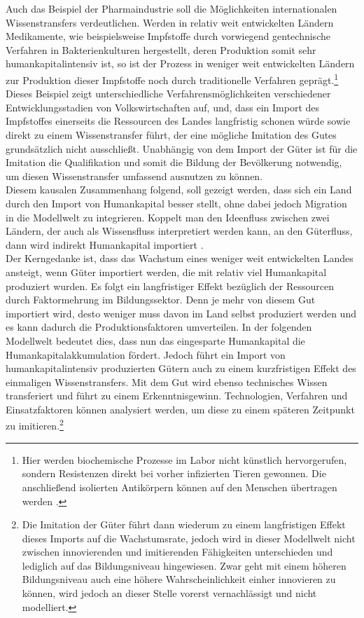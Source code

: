 Auch das Beispiel der Pharmaindustrie soll die Möglichkeiten internationalen Wissenstransfers verdeutlichen. Werden in relativ weit entwickelten Ländern Medikamente, wie beispielsweise Impfstoffe durch vorwiegend gentechnische Verfahren in Bakterienkulturen hergestellt, deren Produktion somit sehr humankapitalintensiv ist, so ist der Prozess in weniger weit entwickelten Ländern zur Produktion dieser Impfstoffe noch durch traditionelle Verfahren geprägt.\footnote{Hier werden biochemische Prozesse im Labor nicht künstlich hervorgerufen, sondern Resistenzen direkt bei vorher infizierten Tieren gewonnen. Die anschlie{\ss}end isolierten Antikörpern können auf den Menschen übertragen werden \citep{Aberle.2010}.} Dieses Beispiel zeigt unterschiedliche Verfahrensmöglichkeiten verschiedener Entwicklungsstadien von Volkswirtschaften auf, und, dass ein Import des Impfstoffes einerseits die Ressourcen des Landes langfristig schonen würde sowie direkt zu einem Wissenstransfer führt, der eine mögliche Imitation des Gutes grundsätzlich nicht ausschlie{\ss}t. Unabhängig von dem Import der Güter ist für die Imitation die Qualifikation und somit die Bildung der Bevölkerung notwendig, um diesen Wissenstransfer umfassend ausnutzen zu können. \\
Diesem kausalen Zusammenhang folgend, soll gezeigt werden, dass sich ein Land durch den Import von Humankapital besser stellt,  ohne dabei jedoch Migration in die Modellwelt zu integrieren. Koppelt man den Ideenfluss zwischen zwei L{\"a}ndern, der auch als Wissensfluss interpretiert werden kann, an den G{\"u}terfluss, dann wird indirekt Humankapital importiert \citep{RiveraBatiz.1991a}.\\
Der Kerngedanke ist, dass das Wachstum eines weniger weit entwickelten Landes ansteigt, wenn Güter importiert werden, die mit relativ viel Humankapital produziert wurden. Es folgt ein langfristiger Effekt bezüglich der Ressourcen durch Faktormehrung im Bildungssektor. Denn je mehr von diesem Gut importiert wird, desto weniger muss davon im Land selbst produziert werden und es kann dadurch die Produktionsfaktoren umverteilen. In der folgenden Modellwelt bedeutet dies, dass nun das eingesparte Humankapital die Humankapitalakkumulation fördert. Jedoch führt ein Import von humankapitalintensiv produzierten Gütern auch zu einem kurzfristigen Effekt des einmaligen Wissenstransfers. Mit dem Gut wird ebenso technisches Wissen transferiert und führt zu einem Erkenntnisgewinn. Technologien, Verfahren und Einsatzfaktoren können analysiert werden, um diese zu einem späteren Zeitpunkt zu imitieren.\footnote{Die Imitation der Güter führt dann wiederum zu einem langfristigen Effekt dieses Imports auf die Wachstumsrate, jedoch wird in dieser Modellwelt nicht zwischen innovierenden und imitierenden Fähigkeiten unterschieden und lediglich auf das Bildungsniveau hingewiesen. Zwar geht mit einem höheren Bildungsniveau auch eine höhere Wahrscheinlichkeit einher innovieren zu können, wird jedoch an dieser Stelle vorerst vernachlässigt und nicht modelliert.}
